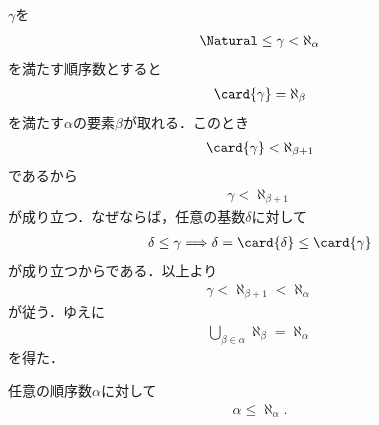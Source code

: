 	\begin{sketch}
		$\gamma$を
		\begin{align}
			\Natural \leq \gamma < \aleph_{\alpha}
		\end{align}
		を満たす順序数とすると
		\begin{align}
			\card{\gamma} = \aleph_{\beta}
		\end{align}
		を満たす$\alpha$の要素$\beta$が取れる．このとき
		\begin{align}
			\card{\gamma} < \aleph_{\beta+1}
		\end{align}
		であるから
		\begin{align}
			\gamma < \aleph_{\beta+1}
		\end{align}
		が成り立つ．なぜならば，任意の基数$\delta$に対して
		\begin{align}
			\delta \leq \gamma \Longrightarrow 
			\delta = \card{\delta} \leq \card{\gamma}
		\end{align}
		が成り立つからである．以上より
		\begin{align}
			\gamma < \aleph_{\beta+1} < \aleph_{\alpha}
		\end{align}
		が従う．ゆえに
		\begin{align}
			\bigcup_{\beta \in \alpha} \aleph_{\beta} = \aleph_{\alpha}
		\end{align}
		を得た．
		\QED
	\end{sketch}
	
	\begin{screen}
		\begin{thm}[順序数がそのアレフ数を超えることはない]
		\label{thm:no_ordinal_number_is_bigger_than_its_aleph_number}
			任意の順序数$\alpha$に対して
			\begin{align}
				\alpha \leq \aleph_{\alpha}.
			\end{align}
		\end{thm}
	\end{screen}
	
